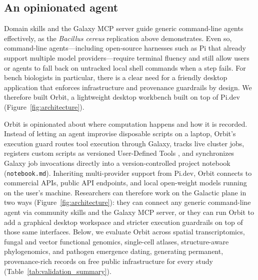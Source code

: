 \documentclass[11pt,letterpaper]{article}
\begin{document}
\subsection{An opinionated agent}

Domain skills and the Galaxy MCP server guide generic command-line agents effectively, as the \textit{Bacillus cereus} replication above demonstrates. Even so, command-line agents---including open-source harnesses such as Pi that already support multiple model providers---require terminal fluency and still allow users or agents to fall back on untracked local shell commands when a step fails. For bench biologists in particular, there is a clear need for a friendly desktop application that enforces infrastructure and provenance guardrails by design. We therefore built Orbit, a lightweight desktop workbench built on top of Pi.dev (Figure~\ref{fig:architecture}).

Orbit is opinionated about where computation happens and how it is recorded. Instead of letting an agent improvise disposable scripts on a laptop, Orbit's execution guard routes tool execution through Galaxy, tracks live cluster jobs, registers custom scripts as versioned User-Defined Tools \cite{galaxyudt2026}, and synchronizes Galaxy job invocations directly into a version-controlled project notebook (\texttt{notebook.md}). Inheriting multi-provider support from Pi.dev, Orbit connects to commercial APIs, public API endpoints, and local open-weight models running on the user's machine. Researchers can therefore work on the Galactic plane in two ways (Figure~\ref{fig:architecture}): they can connect any generic command-line agent via community skills and the Galaxy MCP server, or they can run Orbit to add a graphical desktop workspace and stricter execution guardrails on top of those same interfaces. Below, we evaluate Orbit across spatial transcriptomics, fungal and vector functional genomics, single-cell atlases, structure-aware phylogenomics, and pathogen emergence dating, generating permanent, provenance-rich records on free public infrastructure for every study (Table~\ref{tab:validation_summary}).
\end{document}
